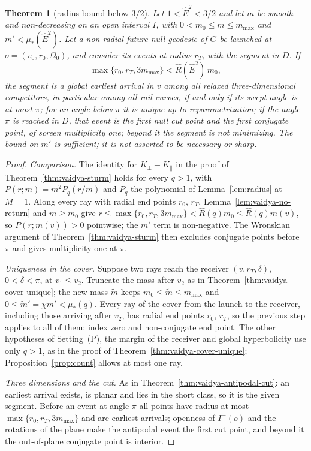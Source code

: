 \documentclass[aip,jmp,amsmath,amssymb,reprint]{revtex4-2}
\newcommand{\Ehat}{\hat E}
\theoremstyle{plain}
\newtheorem{theorem}{Theorem}
\theoremstyle{definition}
\begin{document}
\begin{theorem}[radius bound below $3/2$]\label{thm:vaidya-radius}
Let $1<\Ehat^2<3/2$ and let $m$ be smooth and non-decreasing on an open interval $I$, with
$0<m_0\le m\le m_{\max}$ and $m'<\mu_*(\Ehat^2)$. Let a non-radial future null geodesic of $G$ be launched at
$o=(v_0,r_0,\Omega_0)$, and consider its events at radius $r_T$, with the segment in $D$. If
\[
  \max\{r_0,r_T,3m_{\max}\}<\widehat R(\Ehat^2)\,m_0,
\]
the segment is a global earliest arrival in $v$ among all relaxed three-dimensional competitors, in
particular among all rail curves, if and only if its swept angle is at most $\pi$; for an angle below $\pi$
it is unique up to reparametrization; if the angle $\pi$ is reached in $D$, that event is the first null
cut point and the first conjugate point, of screen multiplicity one; beyond it the segment is not
minimizing. The bound on $m'$ is sufficient; it is not asserted to be necessary or sharp.
\end{theorem}

\begin{proof}
\emph{Comparison.} The identity for $K_\perp-K_\parallel$ in the proof of Theorem~\ref{thm:vaidya-sturm} holds for every
$q>1$, with $P(r;m)=m^2P_q(r/m)$ and $P_q$ the polynomial of Lemma~\ref{lem:radius} at $M=1$. Along every
ray with radial end points $r_0$, $r_T$, Lemma~\ref{lem:vaidya-no-return} and $m\ge m_0$ give
$r\le\max\{r_0,r_T,3m_{\max}\}<\widehat R(q)m_0\le\widehat R(q)m(v)$, so $P(r;m(v))>0$ pointwise; the $m'$ term is
non-negative. The Wronskian argument of Theorem~\ref{thm:vaidya-sturm} then excludes conjugate points before
$\pi$ and gives multiplicity one at $\pi$.

\emph{Uniqueness in the cover.} Suppose two rays reach the receiver $(v,r_T,\delta)$, $0<\delta<\pi$, at
$v_1\le v_2$. Truncate the mass after $v_2$ as in Theorem~\ref{thm:vaidya-cover-unique}; the new mass
$\widetilde m$ keeps $m_0\le\widetilde m\le m_{\max}$ and $0\le\widetilde m'=\chi m'<\mu_*(q)$. Every ray of the cover from the
launch to the receiver, including those arriving after $v_2$, has radial end points $r_0$, $r_T$, so the
previous step applies to all of them: index zero and non-conjugate end point. The other hypotheses of
Setting~(P), the margin of the receiver and global hyperbolicity use only $q>1$, as in the proof of
Theorem~\ref{thm:vaidya-cover-unique}; Proposition~\ref{prop:count} allows at most one ray.

\emph{Three dimensions and the cut.} As in Theorem~\ref{thm:vaidya-antipodal-cut}: an earliest arrival exists, is
planar and lies in the short class, so it is the given segment. Before an event at angle $\pi$ all
points have radius at most $\max\{r_0,r_T,3m_{\max}\}$ and are earliest arrivals; openness of $I^+(o)$ and the
rotations of the plane make the antipodal event the first cut point, and beyond it the out-of-plane
conjugate point is interior.
\end{proof}
\end{document}
